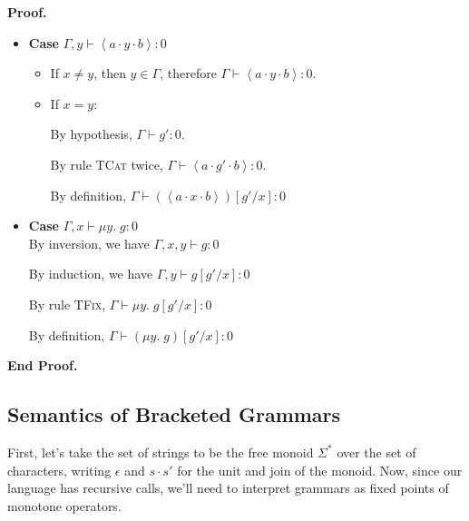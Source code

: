 \documentclass{article}
\newcommand{\fix}[2]{\mu {#1}.\;{#2}}
\newcommand{\lft}[1]{\left<{#1}\right.}
\newcommand{\rgt}[1]{\left.{#1}\right>}
\newcommand{\Word}{\Sigma^{*}}
\newcommand{\judgebalance}[3][\Gamma]{{#1} \vdash {#2} : {#3}}
\newenvironment{proof}{\noindent\textbf{Proof.}}{\noindent\textbf{End Proof.}}
\newenvironment{caseblock}{\begin{itemize}}{\end{itemize}}
\newenvironment{case}[1]{\item \textbf{Case} {#1}\\}{}
\begin{document}
\begin{proof}
\begin{caseblock}
\begin{case}{$\judgebalance[\Gamma, y]{\lft{a}\cdot y \cdot\rgt{b}}{0}$}
      \begin{itemize}
        \item If $x \not= y$, then $y \in \Gamma$, therefore
          $\judgebalance{\lft{a}\cdot y \cdot\rgt{b}}{0}$. 

        \item If $x = y$:
          
          By hypothesis, $\judgebalance{g'}{0}$.

          By rule \textsc{TCat} twice, $\judgebalance{\lft{a}\cdot g'\cdot\rgt{b}}{0}$. 

          By definition, $\judgebalance{(\lft{a}\cdot x \cdot\rgt{b})[g'/x]}{0}$
      \end{itemize}
    \end{case}

    \begin{case}{$\judgebalance[\Gamma, x]{\fix{y}{g}}{0}$}
      By inversion, we have $\judgebalance[\Gamma, x, y]{g}{0}$

      By induction, we have $\judgebalance[\Gamma, y]{g[g'/x]}{0}$

      By rule \textsc{TFix}, $\judgebalance{\fix{y}{g[g'/x]}}{0}$

      By definition, $\judgebalance{(\fix{y}{g})[g'/x]}{0}$
    \end{case}
  \end{caseblock}
\end{proof}



\subsection{Semantics of Bracketed Grammars}

First, let's take the set of strings to be the free monoid $\Word$
over the set of characters, writing $\epsilon$ and $s\cdot s'$ for the
unit and join of the monoid. Now, since our language has recursive
calls, we'll need to interpret grammars as fixed points of monotone
operators.
\end{document}
